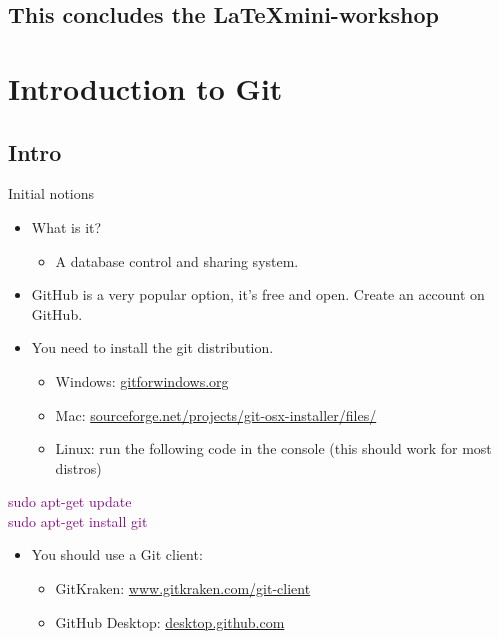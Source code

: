 \documentclass[usenames,dvipsnames,aspectratio=169]{beamer}
\newcommand{\aitem}{\item[$\cdot$]}
\newcommand{\bitem}{\item[-]}
\begin{document}
\subsection{This concludes the \LaTeX mini-workshop}

\section{Introduction to Git}
\subsection{Intro}
\begin{frame}[t]{Initial notions}
\begin{itemize}
\aitem What is it?
\begin{itemize}
\bitem A database control and sharing system. 
\end{itemize}
\aitem GitHub is a very popular option, it's free and open. Create an account on GitHub.
\aitem You need to install the git distribution.
\begin{itemize}
\bitem Windows: \textcolor{blue}{\url{gitforwindows.org}}
\bitem Mac: \textcolor{blue}{\url{sourceforge.net/projects/git-osx-installer/files/}}
\bitem Linux: run the following code in the console (this should work for most distros)
\end{itemize}
\end{itemize}
\textcolor{purple}{
sudo apt-get update\\
sudo apt-get install git}
\begin{itemize}
\aitem You should use a Git client:
\begin{itemize}
\bitem GitKraken: \textcolor{blue}{\url{www.gitkraken.com/git-client}}
\bitem GitHub Desktop: \textcolor{blue}{\url{desktop.github.com}}
\end{itemize}
\end{itemize}
\end{frame}

\end{document}
